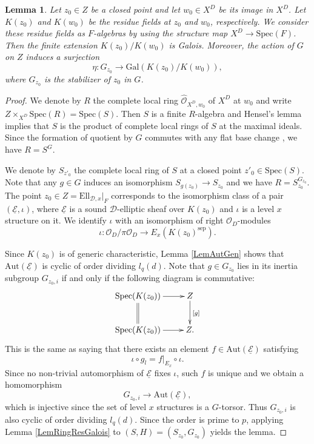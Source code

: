 \documentclass[10pt]{amsart}
\theoremstyle{plain}
\newtheorem{lem}[thm]{Lemma}
\theoremstyle{definition}
\newcommand{\Aut}{\mathrm{Aut}}
\newcommand{\Gal}{\mathrm{Gal}}
\newcommand{\sep}{\mathrm{sep}}
\newcommand{\Spec}{\mathrm{Spec}}
\newcommand{\cO}{\mathcal{O}}
\newcommand{\Ell}{\mathrm{Ell}}
\newcommand{\ucE}{\underline{\mathcal{E}}}
\newcommand{\sD}{\mathscr{D}}
\begin{document}
\begin{lem}\label{LemDSResGalois}
	Let $z_0\in Z$ be a closed point and let $w_0\in X^D$ be its image in $X^D$.
	Let $K(z_0)$ and $K(w_0)$ be the residue fields at $z_0$ and $w_0$, 
	respectively.
	We consider these residue fields as $F$-algebras by using the structure map 
	$X^D\to 
	\Spec(F)$.
	Then the finite extension $K(z_0)/K(w_0)$ is Galois. Moreover, the action 
	of $G$ on $Z$
	induces a surjection
	\[
	\eta: G_{z_0}\to \Gal(K(z_0)/K(w_0)),
	\]
	where $G_{z_0}$ is the stabilizer of $z_0$ in $G$.
\end{lem}
\begin{proof}
	We denote by $R$ the complete local ring $\hat{\cO}_{X^D,w_0}$ of $X^D$ at $w_0$ and 
	write $Z\times_{X^D}\Spec(R)=\Spec(S)$.
	Then $S$ is a finite $R$-algebra and Hensel's lemma implies that 
	$S$ is the product of complete local rings of $S$ at the maximal ideals. 
	Since the formation of quotient by $G$ commutes with any flat base change \cite[Lemma 15.110.7]{Stacks}, 
	we have $R=S^G$. 
	
	We denote by $S_{z'_0}$ the complete local ring of $S$ at a closed point $z'_0\in \Spec(S)$. 
	Note that any $g\in G$ induces an isomorphism $S_{g(z_0)}\to S_{z_0}$ and we have $R=S_{z_0}^{G_{z_0}}$. 
	The point $z_0\in Z=\Ell_{\sD,x}|_F$ corresponds to the isomorphism class of a pair $(\ucE,\iota)$,
	where $\ucE$ is a sound $\sD$-elliptic sheaf over $K(z_0)$ and $\iota$ is a level $x$ structure on it.
	We identify $\iota$ with an isomorphism of right $\cO_D$-modules 
	\[
	\iota: \cO_D/\pi\cO_D\to E_x(K(z_0)^\sep).
	\]
	
	Since $K(z_0)$ is of generic characteristic, Lemma \ref{LemAutGen} shows that 
	$\Aut(\ucE)$ is cyclic of order dividing $l_q(d)$.
	Note that $g\in G_{z_0}$ lies in its inertia subgroup $G_{z_0,i}$ 
	if and only if the following diagram is commutative:
	\[
	\xymatrix{
		\Spec(K(z_0)) \ar[r]\ar@{=}[d] & Z\ar[d]^{[g]}\\
		\Spec(K(z_0)) \ar[r] & Z.
	}
	\]
	This is the same as saying that
	there exists an element $f\in \Aut(\ucE)$ satisfying
	\[
	\iota\circ g_l=f|_{E_x}\circ\iota.
	\]
	Since no non-trivial automorphism of $\ucE$ fixes $\iota$, such $f$ is unique 
	and we obtain a homomorphism
	\[
	G_{z_0,i}\to \Aut(\ucE),
	\]
	which is injective since the set of level $x$ structures is a $G$-torsor.
	Thus $G_{z_0,i}$ is also cyclic of order dividing $l_q(d)$.
	Since the order is prime to $p$, applying Lemma \ref{LemRingResGalois} to $(S,H)=(S_{z_0},G_{z_0})$ yields the lemma.
\end{proof}
\end{document}
